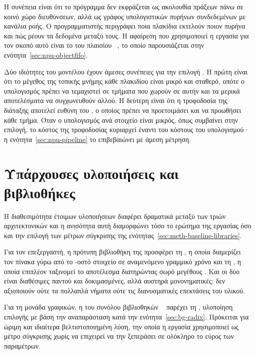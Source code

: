 Η συνέπεια είναι ότι το πρόγραμμα δεν εκφράζεται ως ακολουθία πράξεων πάνω σε
κοινό χώρο διευθύνσεων, αλλά ως γράφος υπολογιστικών πυρήνων συνδεδεμένων με
κανάλια ροής. Ο προγραμματιστής περιγράφει ποια πλακίδια εκτελούν ποιον πυρήνα
και πώς ρέουν τα δεδομένα μεταξύ τους. Η αφαίρεση που χρησιμοποιεί η εργασία για
τον σκοπό αυτό είναι το  του πλαισίου
~\cite{mliraie}, το οποίο παρουσιάζεται στην
ενότητα~\ref{sec:npu-objectfifo}.

Δύο ιδιότητες του μοντέλου έχουν άμεσες συνέπειες για την επιλογή . Η
πρώτη είναι ότι το μέγεθος της τοπικής μνήμης κάθε πλακιδίου είναι μικρό και
σταθερό, οπότε ο υπολογισμός πρέπει να τεμαχιστεί σε τμήματα που χωρούν σε αυτήν
και τα μερικά αποτελέσματα να συγχωνευθούν αλλού. Η δεύτερη είναι ότι η
τροφοδοσία της διάταξης αποτελεί ευθύνη του , ο οποίος πρέπει να
προετοιμάσει και να προωθήσει κάθε τμήμα. Όταν ο υπολογισμός ανά στοιχείο είναι
μικρός, όπως συμβαίνει στην επιλογή, το κόστος της τροφοδοσίας κυριαρχεί έναντι
του κόστους του υπολογισμού· η ενότητα~\ref{sec:npu-pipeline} το επιβεβαιώνει με
άμεση μέτρηση.

\section{Υπάρχουσες υλοποιήσεις και βιβλιοθήκες}
\label{sec:bg-related}

Η διαθεσιμότητα έτοιμων υλοποιήσεων διαφέρει δραματικά μεταξύ των τριών
αρχιτεκτονικών και η ανισότητα αυτή διαμορφώνει τόσο το ερώτημα της εργασίας
όσο και την επιλογή των μέτρων σύγκρισης της
ενότητας~\ref{sec:meth-baseline-libraries}.

Για τον επεξεργαστή, η πρότυπη βιβλιοθήκη της  προσφέρει τη
, η οποία διαμερίζει τον πίνακα γύρω από το -οστό
στοιχείο σε αναμενόμενο γραμμικό χρόνο και τη , η οποία
επιπλέον ταξινομεί το αποτέλεσμα διατηρώντας σωρό μεγέθους . Και οι δύο
είναι διαθέσιμες παντού και δοκιμασμένες, αλλά αυστηρά μονονηματικές: δεν
αξιοποιούν ούτε τα πολλαπλά νήματα ούτε τις διανυσματικές επεκτάσεις του
υλικού.

Για τη μονάδα γραφικών, η  του συνόλου βιβλιοθηκών
~\cite{cccl} παρέχει τη , υλοποίηση επιλογής με βάση την
αναπαράσταση κατά την ενότητα~\ref{sec:bg-radix}. Πρόκειται για ώριμη και
ιδιαίτερα βελτιστοποιημένη λύση, την οποία η εργασία χρησιμοποιεί ως μέτρο
σύγκρισης χωρίς να επιχειρεί να την ξεπεράσει σε ολόκληρο το εύρος των
παραμέτρων.

